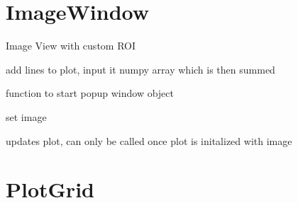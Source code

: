 \documentclass[letterpaper,10pt,english]{sphinxmanual}
\begin{document}
\section{ImageWindow}
\label{ImageWindow:imagewindow}\label{ImageWindow::doc}

\begin{fulllineitems}
\label{ImageWindow:Dataplots.ImageWindow}
Image View with custom ROI

\begin{fulllineitems}
\label{ImageWindow:Dataplots.ImageWindow.add_lines}
add lines to plot, input it numpy array which is then summed

\end{fulllineitems}


\begin{fulllineitems}
\label{ImageWindow:Dataplots.ImageWindow.popup}
function to start popup window object

\end{fulllineitems}


\begin{fulllineitems}
\label{ImageWindow:Dataplots.ImageWindow.setImage}
set image

\end{fulllineitems}


\begin{fulllineitems}
\label{ImageWindow:Dataplots.ImageWindow.updatePlot}
updates plot, can only be called once plot is initalized with image

\end{fulllineitems}


\end{fulllineitems}



\section{PlotGrid}
\label{PlotGrid::doc}\label{PlotGrid:plotgrid}
\end{document}
